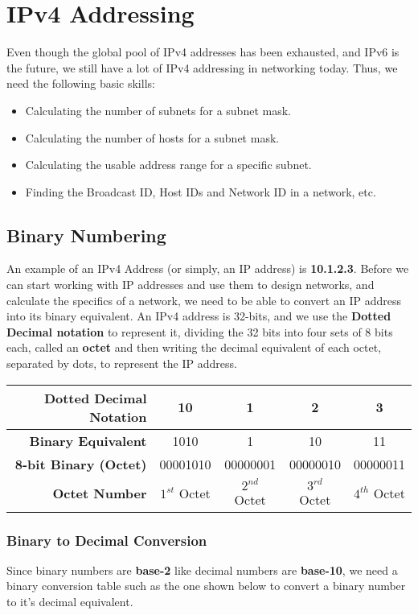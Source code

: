 \chapter{IPv4 Addressing}
Even though the global pool of IPv4 addresses has been exhausted, and IPv6 is the future, we still have a lot of IPv4 addressing in networking today. Thus, we need the following basic skills: 
\vspace{-10pt}
\begin{itemize}
	\item Calculating the number of subnets for a subnet mask.
	\item Calculating the number of hosts for a subnet mask.
	\item Calculating the usable address range for a specific subnet.
	\item Finding the Broadcast ID, Host IDs and Network ID in a network, etc. 
\end{itemize}

\section{Binary Numbering}
An example of an IPv4 Address (or simply, an IP address) is \textbf{10.1.2.3}. Before we can start working with IP addresses and use them to design networks, and calculate the specifics of a network, we need to be able to convert an IP address into its binary equivalent. An IPv4 address is 32-bits, and we use the \textbf{Dotted Decimal notation} to represent it, dividing the 32 bits into four sets of 8 bits each, called an \textbf{octet} and then writing the decimal equivalent of each octet, separated by dots, to represent the IP address. 

\begin{center}
	\begin{tabular}{rcccc}
		\toprule
		\textbf{Dotted Decimal Notation} &10 &1 &2 &3 \\
		\midrule
		\textbf{Binary Equivalent}	&1010 &1 &10 &11\\
		\textbf{8-bit Binary (Octet)}	&00001010 &00000001 &00000010 &00000011\\
		\textbf{Octet Number} &$1^{st}$ Octet &$2^{nd}$ Octet &$3^{rd}$ Octet &$4^{th}$ Octet  \\
		\bottomrule
	\end{tabular}
\end{center}

\subsection{Binary to Decimal Conversion}
Since binary numbers are \textbf{base-2} like decimal numbers are \textbf{base-10}, we need a binary conversion table such as the one shown below to convert a binary number to it's decimal equivalent.

